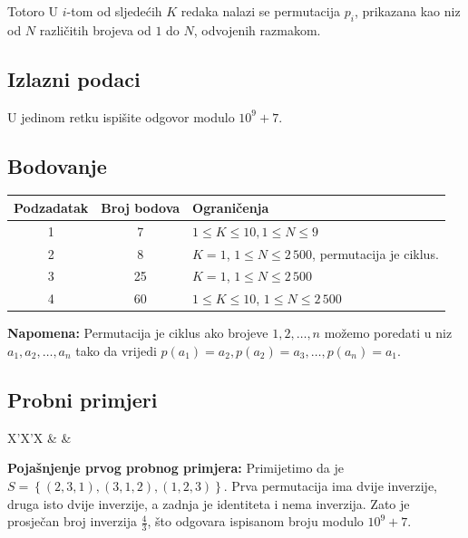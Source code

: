 \begin{statement}[
  problempoints=100,
  timelimit=1 sekunda,
  memorylimit=512 MiB,
]{Totoro}
U $i$-tom od sljedećih $K$ redaka nalazi se permutacija $p_i$, 
prikazana kao niz od $N$ različitih brojeva od $1$ do $N$, odvojenih razmakom.

\subsection*{Izlazni podaci}
U jedinom retku ispišite odgovor modulo $10^9 + 7$. 

\subsection*{Bodovanje}
{\renewcommand{\arraystretch}{1.4}
  \setlength{\tabcolsep}{6pt}
  \begin{tabular}{ccl}
 Podzadatak & Broj bodova & Ograničenja \\ \midrule
  1 & 7 & $ 1 \le K \le 10, 1 \le N \le 9$ \\
  2 & 8 & $ K = 1 $, $1 \le N \le 2\,500$, permutacija je ciklus. \\
  3 & 25 & $ K = 1$, $1 \le N \le 2\,500$ \\
  4 & 60 & $1 \le K \le 10$, $1 \le N \le 2\,500$ \\
\end{tabular}}

\textbf{Napomena:}
    Permutacija je ciklus ako brojeve $1, 2, \ldots, n$
    možemo poredati u niz $a_1, a_2, \ldots, a_n$ tako da vrijedi
    $p(a_1) = a_2, p(a_2) = a_3, \ldots, p(a_n) = a_1$.
\clearpage
\subsection*{Probni primjeri}
\begin{tabularx}{\textwidth}{X'X'X}
 &
 &
\end{tabularx}

\textbf{Pojašnjenje prvog probnog primjera:}
Primijetimo da je $S = \left\{ (2, 3, 1), (3, 1, 2), (1, 2, 3)\right\}$.
Prva permutacija ima dvije inverzije, druga isto dvije inverzije, a zadnja
je identiteta i nema inverzija. Zato je prosječan broj inverzija $\frac{4}{3}$,
što odgovara ispisanom broju modulo $10^9 + 7$.


\end{statement}
